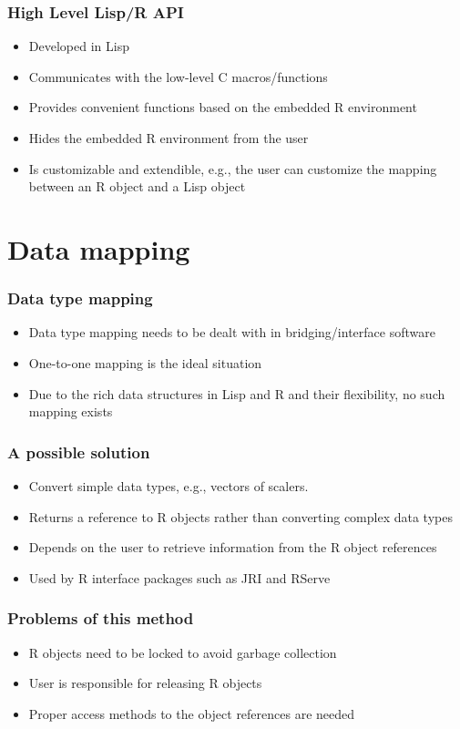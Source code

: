 \documentclass{beamer}
\begin{document}
\begin{frame}
\frametitle{High Level Lisp/R API}
\begin{itemize}
	\item Developed in Lisp
	\item Communicates with the low-level C macros/functions
	\item Provides convenient functions based on the embedded R environment
	\item Hides the embedded R environment from the user
	\item Is customizable and extendible, e.g., the user can customize the mapping between an R object and a Lisp object 
\end{itemize}
\end{frame}

\section{Data mapping}

\begin{frame}
\frametitle{Data type mapping}
\begin{itemize}
	\item Data type mapping needs to be dealt with in bridging/interface software
	\item One-to-one mapping is the ideal situation
	\item Due to the rich data structures in Lisp and R and their flexibility, no such mapping exists
\end{itemize}
\end{frame}

\begin{frame}
\frametitle{A possible solution}
\begin{itemize}
	\item Convert simple data types, e.g., vectors of scalers.
	\item Returns a reference to R objects rather than converting complex data types
	\item Depends on the user to retrieve information from the R object references
	\item Used by R interface packages such as JRI and RServe
\end{itemize}
\end{frame}

\begin{frame}
\frametitle{Problems of this method}
\begin{itemize}
	\item R objects need to be locked to avoid garbage collection
	\item User is responsible for releasing R objects
	\item Proper access methods to the object references are needed
\end{itemize}
\end{frame}
\end{document}
